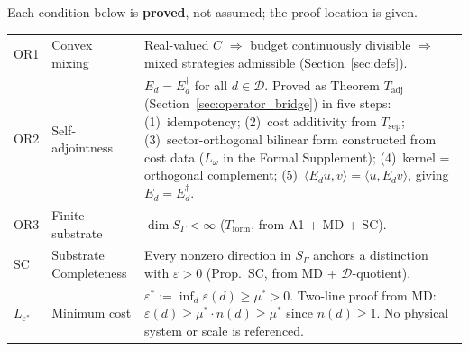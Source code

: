 \documentclass[11pt]{article}
\theoremstyle{remark}
\begin{document}
\begin{tcolorbox}[defbox, title={Formal Specification III: Derived Regularity Conditions}]

Each condition below is \textbf{proved}, not assumed; the proof location is given.

\smallskip
\begin{tabular}{@{}p{1.5cm}p{3.4cm}p{7.5cm}@{}}
OR1 & Convex mixing & Real-valued $C$ $\Rightarrow$ budget continuously divisible $\Rightarrow$ mixed strategies admissible (Section~\ref{sec:defs}). \\[3pt]
OR2 & Self-adjointness & $E_d = E_d^\dagger$ for all $d \in \mathcal{D}$.  Proved as Theorem $T_{\mathrm{adj}}$ (Section~\ref{sec:operator_bridge}) in five steps: (1)~idempotency; (2)~cost additivity from $T_{\mathrm{sep}}$; (3)~sector-orthogonal bilinear form constructed from cost data ($L_\omega$ in the Formal Supplement); (4)~kernel = orthogonal complement; (5)~$\langle E_d u, v\rangle = \langle u, E_d v\rangle$, giving $E_d = E_d^\dagger$. \\[3pt]
OR3 & Finite substrate & $\dim S_\Gamma < \infty$ ($T_{\mathrm{form}}$, from A1 + MD + SC). \\[3pt]
SC & Substrate Completeness & Every nonzero direction in $S_\Gamma$ anchors a distinction with $\varepsilon > 0$ (Prop.~SC, from MD + $\mathcal{D}$-quotient). \\[3pt]
$L_{\varepsilon^*}$ & Minimum cost & $\varepsilon^* := \inf_d \varepsilon(d) \ge \mu^* > 0$.  Two-line proof from MD: $\varepsilon(d) \ge \mu^* \cdot n(d) \ge \mu^*$ since $n(d) \ge 1$.  No physical system or scale is referenced. \\
\end{tabular}
\end{tcolorbox}
\end{document}

